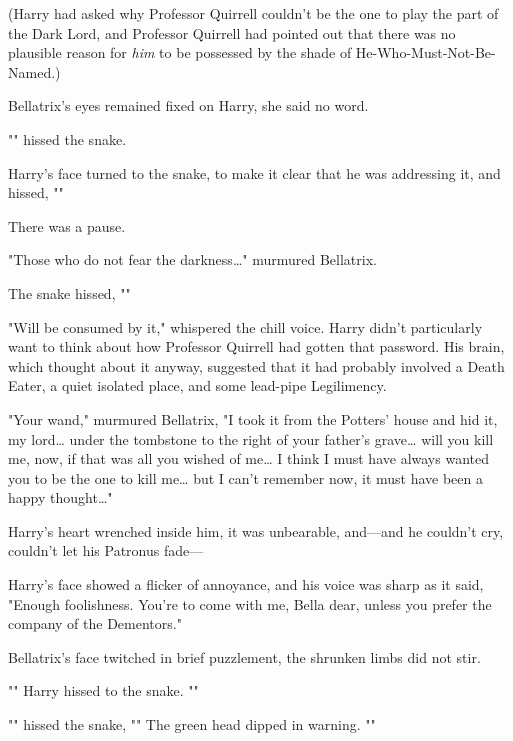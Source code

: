 (Harry had asked why Professor Quirrell couldn't be the one to play the part of
the Dark Lord, and Professor Quirrell had pointed out that there was no
plausible reason for \emph{him} to be possessed by the shade of
He-Who-Must-Not-Be-Named.)

Bellatrix's eyes remained fixed on Harry, she said no word.

"" hissed the snake.

Harry's face turned to the snake, to make it clear that he was addressing it,
and hissed, ""

There was a pause.

"Those who do not fear the darkness{\ldots}" murmured Bellatrix.

The snake hissed, ""

"Will be consumed by it," whispered the chill voice. Harry didn't particularly
want to think about how Professor Quirrell had gotten that password. His brain,
which thought about it anyway, suggested that it had probably involved a Death
Eater, a quiet isolated place, and some lead-pipe Legilimency.

"Your wand," murmured Bellatrix, "I took it from the Potters' house and hid it,
my lord{\ldots} under the tombstone to the right of your father's grave{\ldots}
will you kill me, now, if that was all you wished of me{\ldots} I think I must
have always wanted you to be the one to kill me{\ldots} but I can't remember
now, it must have been a happy thought{\ldots}"

Harry's heart wrenched inside him, it was unbearable, and---and he couldn't
cry, couldn't let his Patronus fade---

Harry's face showed a flicker of annoyance, and his voice was sharp as it said,
"Enough foolishness. You're to come with me, Bella dear, unless you prefer the
company of the Dementors."

Bellatrix's face twitched in brief puzzlement, the shrunken limbs did not stir.

"" Harry hissed to the snake. ""

"" hissed the snake, "" The green head dipped in warning.
""

